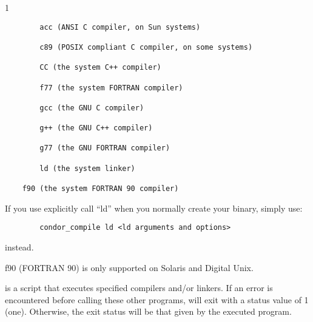 \begin{ManPage}{\label{man-condor-compile}}{1}
\begin{verbatim}
        acc (ANSI C compiler, on Sun systems) 

        c89 (POSIX compliant C compiler, on some systems) 

        CC (the system C++ compiler) 

        f77 (the system FORTRAN compiler) 

        gcc (the GNU C compiler) 

        g++ (the GNU C++ compiler) 

        g77 (the GNU FORTRAN compiler) 

        ld (the system linker) 

	f90 (the system FORTRAN 90 compiler)
\end{verbatim}

\Note If you use explicitly call ``ld'' when you normally create
your binary, simply use:
\begin{verbatim}
        condor_compile ld <ld arguments and options>
\end{verbatim}
instead.  

\Note f90 (FORTRAN 90) is only supported on Solaris and Digital Unix. 

\ExitStatus

 is a script that executes specified compilers and/or linkers.
If an error is encountered before calling these other programs,
 will exit with a status value of 1 (one).
Otherwise, the exit status will be that given by the executed program.

\end{ManPage}
